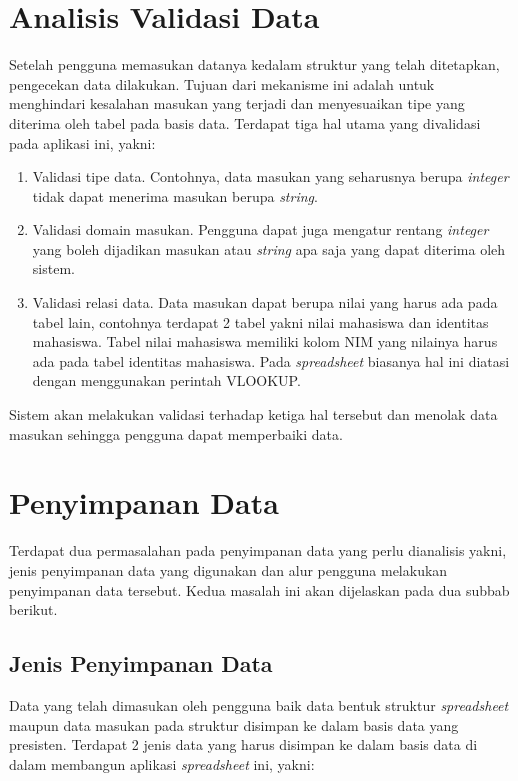 \section{Analisis Validasi Data}
Setelah pengguna memasukan datanya kedalam struktur yang telah ditetapkan, pengecekan data dilakukan. Tujuan dari mekanisme ini adalah untuk menghindari kesalahan masukan yang terjadi dan menyesuaikan tipe yang diterima oleh tabel pada basis data. Terdapat tiga hal utama yang divalidasi pada aplikasi ini, yakni:
\begin{enumerate}
	\item Validasi tipe data. Contohnya, data masukan yang seharusnya berupa \textit{integer} tidak dapat menerima masukan berupa \textit{string}.
	\item Validasi domain masukan. Pengguna dapat juga mengatur rentang \textit{integer} yang boleh dijadikan masukan atau \textit{string} apa saja yang dapat diterima oleh sistem.
	\item Validasi relasi data. Data masukan dapat berupa nilai yang harus ada pada tabel lain, contohnya terdapat 2 tabel yakni nilai mahasiswa dan identitas mahasiswa. Tabel nilai mahasiswa memiliki kolom NIM yang nilainya harus ada pada tabel identitas mahasiswa. Pada \textit{spreadsheet} biasanya hal ini diatasi dengan menggunakan perintah VLOOKUP.
\end{enumerate}
Sistem akan melakukan validasi terhadap ketiga hal tersebut dan menolak data masukan sehingga pengguna dapat memperbaiki data. 

\section{Penyimpanan Data}
Terdapat dua permasalahan pada penyimpanan data yang perlu dianalisis yakni, jenis penyimpanan data yang digunakan dan alur pengguna melakukan penyimpanan data tersebut. Kedua masalah ini akan dijelaskan pada dua subbab berikut.

	\subsection{Jenis Penyimpanan Data} \label{JenisPenyimpanan}
	Data yang telah dimasukan oleh pengguna baik data bentuk struktur \textit{spreadsheet} maupun data masukan pada struktur disimpan ke dalam basis data yang presisten. Terdapat 2 jenis data yang harus disimpan ke dalam basis data di dalam membangun aplikasi \textit{spreadsheet} ini, yakni:

